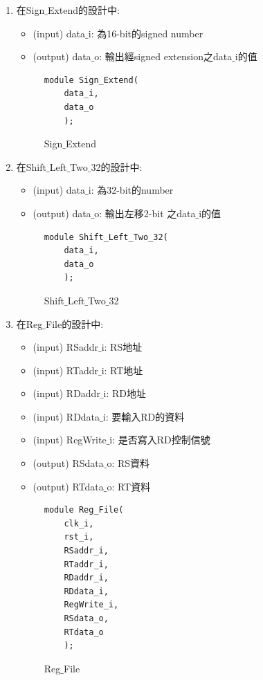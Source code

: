 \documentclass[12pt,a4paper]{article}
\theoremstyle{definition}
\begin{document}
\begin{enumerate}
%
\item
在Sign$\_$Extend的設計中:
\begin{itemize}
\item (input) data$\_$i: 為16-bit的signed number
\item (output) data$\_$o: 輸出經signed extension之data$\_$i的值
\end{itemize}

\begin{figure}[H]
\centering
\begin{lstlisting}[caption={}]
module Sign_Extend(
    data_i,
    data_o
    );
\end{lstlisting}
\caption{Sign$\_$Extend}
\label{fig:alu_top_}
\end{figure}

%
\item
在Shift$\_$Left$\_$Two$\_$32的設計中:
\begin{itemize}
\item (input) data$\_$i: 為32-bit的number
\item (output) data$\_$o: 輸出左移2-bit 之data$\_$i的值
\end{itemize}

\begin{figure}[H]
\centering
\begin{lstlisting}[caption={}]
module Shift_Left_Two_32(
    data_i,
    data_o
    );
\end{lstlisting}
\caption{Shift$\_$Left$\_$Two$\_$32}
\label{fig:alu_top_}
\end{figure}

%
\item
在Reg$\_$File的設計中:
\begin{itemize}
\item (input) RSaddr$\_$i: RS地址
\item (input) RTaddr$\_$i: RT地址
\item (input) RDaddr$\_$i: RD地址
\item (input) RDdata$\_$i: 要輸入RD的資料
\item (input) RegWrite$\_$i: 是否寫入RD控制信號

\item (output) RSdata$\_$o: RS資料
\item (output) RTdata$\_$o: RT資料
\end{itemize}

\begin{figure}[H]
\centering
\begin{lstlisting}[caption={}]
module Reg_File(
    clk_i,
	rst_i,
    RSaddr_i,
    RTaddr_i,
    RDaddr_i,
    RDdata_i,
    RegWrite_i,
    RSdata_o,
    RTdata_o
    );
\end{lstlisting}
\caption{Reg$\_$File}
\label{fig:alu_top_}
\end{figure}

\end{enumerate}
\end{document}
